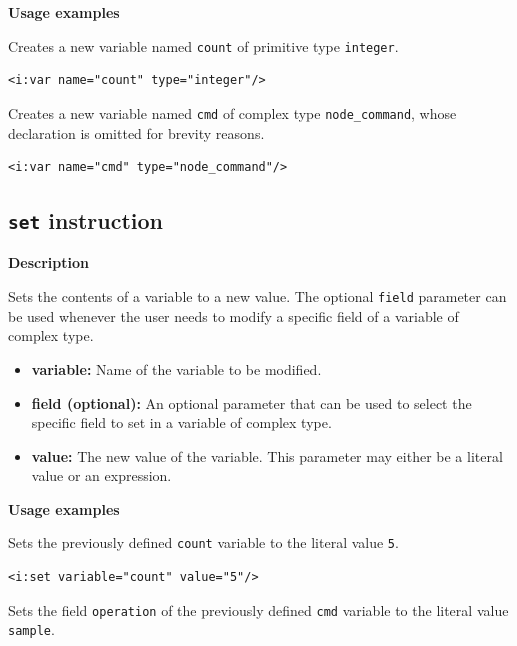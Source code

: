 \textbf{Usage examples}

Creates a new variable named \texttt{count} of primitive type \texttt{integer}.

\lstset{language=XML}
\begin{lstlisting}
<i:var name="count" type="integer"/>
\end{lstlisting}

Creates a new variable named \texttt{cmd} of complex type
\texttt{node\_command}, whose declaration is omitted for brevity reasons.

\lstset{language=XML}
\begin{lstlisting}
<i:var name="cmd" type="node_command"/>
\end{lstlisting}

\subsection{\texttt{set} instruction}

\textbf{Description}

Sets the contents of a variable to a new value. The optional \texttt{field}
parameter can be used whenever the user needs to modify a specific field of a
variable of complex type.

\begin{itemize}

    \item \textbf{variable:} Name of the variable to be modified.

    \item \textbf{field (optional):} An optional parameter that can be used to
        select the specific field to set in a variable of complex type.

    \item \textbf{value:} The new value of the variable. This parameter may
        either be a literal value or an expression.

\end{itemize}

\textbf{Usage examples}

Sets the previously defined \texttt{count} variable to the literal value \texttt{5}.

\lstset{language=XML}
\begin{lstlisting}
<i:set variable="count" value="5"/>
\end{lstlisting}

Sets the field \texttt{operation} of the previously defined \texttt{cmd}
variable to the literal value \texttt{sample}.

